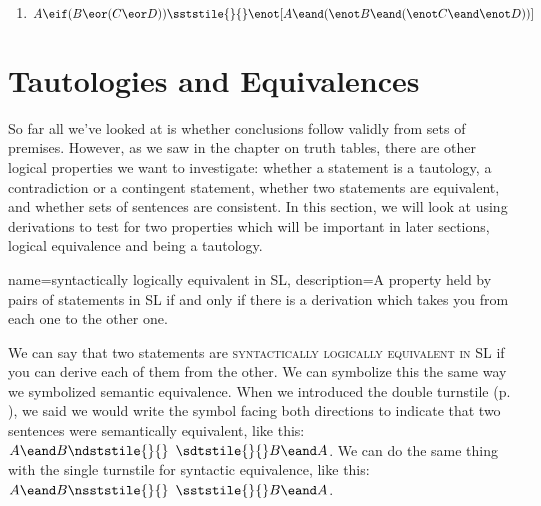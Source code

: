 \begin{enumerate}[label=(\arabic*)]
\item	$A \eif (B \eor (C \eor D))  \sststile{}{} \enot[A \eand (\enot B \eand (\enot C \eand \enot D))] $

%





\end{enumerate}





\section{Tautologies and Equivalences}


So far all we've looked at is whether conclusions follow validly from sets of premises. However, as we saw in the chapter on truth tables, there are other logical properties we want to investigate: whether a statement is a tautology, a contradiction or a contingent statement, whether two statements are equivalent, and whether sets of sentences are consistent. In this section, we will look at using derivations to test for two properties which will be important in later sections, logical equivalence and being a tautology.


{
name=syntactically logically equivalent in SL,
description={A property held by pairs of statements in SL if and only if there is a derivation which takes you from each one to the other one.}
}

We can say that two statements are \textsc{\gls{syntactically logically equivalent in SL}} \label{def:syntactically_logically_equivalent_in_sl} if you can derive each of them from the other. We can symbolize this the same way we symbolized semantic equivalence. When we introduced the double turnstile (p. \pageref{defDoubleTurnstile}), we said we would write the symbol facing both directions to indicate that two sentences were semantically equivalent, like this: $A \eand B \ndststile{}{} \hspace{.5em} \sdtstile{}{} B \eand A$. We can do the same thing with the single turnstile for syntactic equivalence, like this:  $A \eand B \nsststile{}{} \hspace{.5em} \sststile{}{} B \eand A$. 

